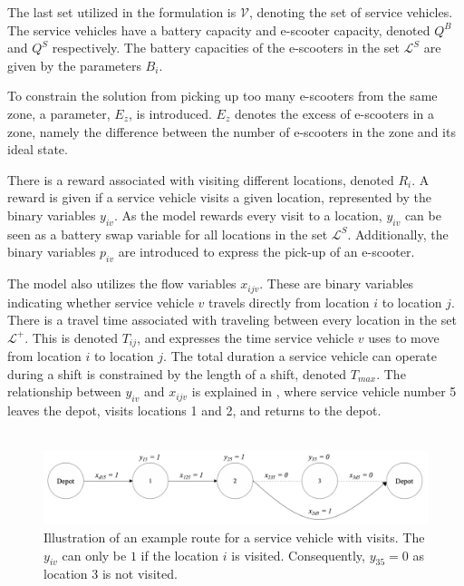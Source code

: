 The last set utilized in the formulation is $\mathcal{V}$, denoting the set of service vehicles. The service vehicles have a battery capacity and e-scooter capacity, denoted $Q^{B}$ and $Q^{S}$ respectively. The battery capacities of the e-scooters in the set $\mathcal{L}^{S}$ are given by the parameters $B_i$.

To constrain the solution from picking up too many e-scooters from the same zone, a parameter, $E_z$, is introduced. $E_z$ denotes the excess of e-scooters in a zone, namely the difference between the number of e-scooters in the zone and its ideal state. 

There is a reward associated with visiting different locations, denoted $R_{i}$. A reward is given if a service vehicle visits a given location, represented by the binary variables $y_{iv}$. As the model rewards every visit to a location, $y_{iv}$ can be seen as a battery swap variable for all locations in the set $\mathcal{L}^{S}$. Additionally, the binary variables $p_{iv}$ are introduced to express the pick-up of an e-scooter. 

The model also utilizes the flow variables $x_{ijv}$. These are binary variables indicating whether service vehicle $v$ travels directly from location $i$ to location $j$. There is a travel time associated with traveling between every location in the set $\mathcal{L}^{+}$. This is denoted $T_{ij}$, and expresses the time service vehicle $v$ uses to move from location $i$ to location $j$. The total duration a service vehicle can operate during a shift is constrained by the length of a shift, denoted $T_{max}$. The relationship between $y_{iv}$ and $x_{ijv}$ is explained in , where service vehicle number 5 leaves the depot, visits locations 1 and 2, and returns to the depot. 
\\\
\begin{figure}[h]
    \centering
    \includegraphics[width=15cm]{Images/y_x_illustration.png}
    \caption[Illustration of an example route for a service vehicle with visits.]{Illustration of an example route for a service vehicle with visits. The $y_{iv}$ can only be $1$ if the location $i$ is visited. Consequently, $y_{35}=0$ as location 3 is not visited.}
    \label{fig:y_x_illustration}
\end{figure}

